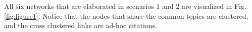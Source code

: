 \documentclass[AMS,STIX1COL]{WileyNJD-v2}
\DeclarePairedDelimiter\floor{\lfloor}{\rfloor}
\begin{document}
{All six networks that are elaborated in scenarios $1$ and $2$ are visualized in Fig.\ref{fig:figure1}.
Notice that the nodes that share the common topics are clustered,
and the cross clustered links are ad-hoc citations.






}
\end{document}
